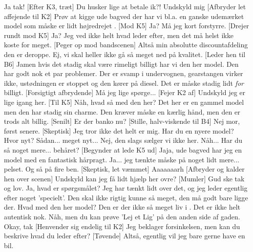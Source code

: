 \documentclass[a4paper,11pt]{article}
\begin{document}
\begin{sketch}
 Ja tak! 
[Efter K3, træt] Du husker lige at betale ik?!
 Undskyld mig
[Afbryder let affejende til K2] Prøv at kigge ude bagved der har vi bl.a. en ganske udemærket model som måske er lidt højredrejet . 
[Mod K5] Ja?
 Må jeg kort forstyrre.
[Drejer rundt mod K5] Ja?
 Jeg ved ikke helt hvad leder efter, men det må helst ikke koste for meget.
[Peger op mod bandscenen] Altså min absolutte discountafdeling den er deroppe. 
 Ej, vi skal heller ikke gå så meget ned på kvalitet. 
[Leder hen til B6] Jamen hvis det stadig skal være rimeligt billigt har vi den her model. Den har godt nok et par problemer. Der er svamp i undervognen, gearstangen virker ikke, ustødningen er stoppet og den kører på diesel. 
 Det er måske stadig lidt \emph{for} billigt.
[Forsigtigt afbrydende] Må jeg lige spørge...
[Fejer K2 af] Undskyld jeg er lige igang her. 
[Til K5] Nåh, hvad så med den her?  Det her er en gammel model men den har stadig sin charme. Den kræver måske en kærlig hånd, men den er trods alt billig.
[Senilt] Er der banko nu?
[Stille, halv-viskende til B4] Nej mor, først senere. 
[Skeptisk] Jeg tror ikke det helt er mig. Har du en nyere model?
 Hvor nyt?
 Sådan... meget nyt...
 Nej, den slags sælger vi ikke her.
 Nåh... Har du så noget mere... behåret? 
[Begynder at lede K5 ud] Jaja, ude bagved har jeg en model med en fantastisk hårpragt.
 Ja... jeg tænkte måske på noget lidt mere... pelset. Og så på fire ben.
[Skeptisk, let væmmet] Aaaaaaarh
[Afbryder og kalder hen over scenen] Undskyld kan jeg få lidt hjælp her ovre?
[Mumler] Gud ske tak og lov.  Ja, hvad er spørgsmålet?
 Jeg har tænkt lidt over det, og jeg leder egentlig efter noget 'specielt'. Den skal ikke rigtig kunne så meget, den må godt bare ligge der. 
 Hvad med den her model? Den er der ikke så meget liv i .
 Det er ikke helt autentisk nok.
 Nåh, men du kan prøve 'Lej et Lig' på den anden side af gaden.
  Okay, tak
[Henvender sig endelig til K2] Jeg beklager forsinkelsen, men kan du beskrive hvad du leder efter?
[Tøvende] Altså, egentlig vil jeg bare gerne have en bil.

\end{sketch}
\end{document}
